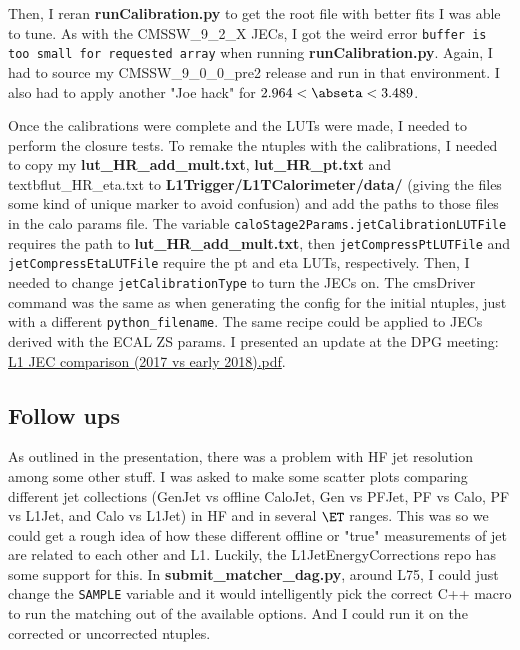 Then, I reran \textbf{runCalibration.py} to get the root file with better fits I was able to tune. As with the CMSSW\_9\_2\_X JECs, I got the weird error \texttt{buffer is too small for requested array} when running \textbf{runCalibration.py}. Again, I had to source my CMSSW\_9\_0\_0\_pre2 release and run in that environment. I also had to apply another "Joe hack" for $2.964 < \abseta < 3.489$.

Once the calibrations were complete and the LUTs were made, I needed to perform the closure tests. To remake the ntuples with the calibrations, I needed to copy my \textbf{lut\_HR\_add\_mult.txt}, \textbf{lut\_HR\_pt.txt} and textbf{lut\_HR\_eta.txt} to \textbf{L1Trigger/L1TCalorimeter/data/} (giving the files some kind of unique marker to avoid confusion) and add the paths to those files in the calo params file. The variable \texttt{caloStage2Params.jetCalibrationLUTFile} requires the path to \textbf{lut\_HR\_add\_mult.txt}, then \texttt{jetCompressPtLUTFile} and \texttt{jetCompressEtaLUTFile} require the pt and eta LUTs, respectively. Then, I needed to change \texttt{jetCalibrationType} to turn the JECs on. The cmsDriver command was the same as when generating the config for the initial ntuples, just with a different \texttt{python\_filename}. The same recipe could be applied to JECs derived with the ECAL ZS params. I presented an update at the DPG meeting: \href{run:modules/Sec 20 - Service Work Jet Energy Corrections/figures/20180423 L1 JEC comparison (2017 vs early 2018).pdf}{L1 JEC comparison (2017 vs early 2018).pdf}.


\subsection{Follow ups}

As outlined in the presentation, there was a problem with HF jet resolution among some other stuff. I was asked to make some scatter plots comparing different jet collections (GenJet vs offline CaloJet, Gen vs PFJet, PF vs Calo, PF vs L1Jet, and Calo vs L1Jet) in HF and in several $\ET$ ranges. This was so we could get a rough idea of how these different offline or "true" measurements of jet \pt are related to each other and L1. Luckily, the L1JetEnergyCorrections repo has some support for this. In \textbf{submit\_matcher\_dag.py}, around L75, I could just change the \texttt{SAMPLE} variable and it would intelligently pick the correct C++ macro to run the matching out of the available options. And I could run it on the corrected or uncorrected ntuples.

